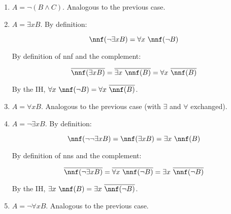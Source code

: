 \begin{itemize}
\begin{enumerate}
			By the IH, $\nnf(B) \vee \nnf(C) = \overline{\mt{nnf}(\neg B)} \vee \overline{\mt{nnf}(\neg C)} $\footnote{The equivalence can be derived from the IH as follows: $\overline{\nnf(\neg F)} \underset{IH}{=} \overline{\overline{\nnf(F)}} = \nnf(F)$. This detail will be omitted in the subsequent cases where it applies.}.
			
			\item $A = \neg (B \wedge C)$. Analogous to the previous case.
			
			\item $A = \exists x B$. By definition:
			
			\begin{equation}
				\nnf(\neg \exists x B) = \forall x\ \nnf(\neg B)
			\end{equation}
			
			By definition of nnf and the complement:
			
			\begin{equation}
				\overline{\nnf(\exists x B)} = \overline{\exists x\ \nnf(B)} = \forall x\ \overline{\nnf(B)}
			\end{equation}
			
			By the IH, $\forall x\ \nnf(\neg B) = \forall x\ \overline{\nnf(B)}$.
			
			\item $A = \forall x B$. Analogous to the previous case (with $\exists$ and $\forall$ exchanged).
			
			\item $A = \neg \exists x B$. By definition:
			
			\begin{equation}
				\nnf(\neg \neg \exists x B) = \nnf(\exists x B) = \exists x\ \nnf(B)
			\end{equation}
			
			By definition of nns and the complement:
			
			\begin{equation}
				\overline{\nnf(\neg \exists x B)} = \overline{\forall x\ \nnf(\neg B)} = \exists x\ \overline{\nnf(\neg B)}
			\end{equation}
			
			By the IH, $\exists x\ \nnf(B) = \exists x\ \overline{\nnf(\neg B)}$.
			
			\item $A = \neg \forall x B$. Analogous to the previous case.
			
		\end{enumerate}
\end{itemize}

